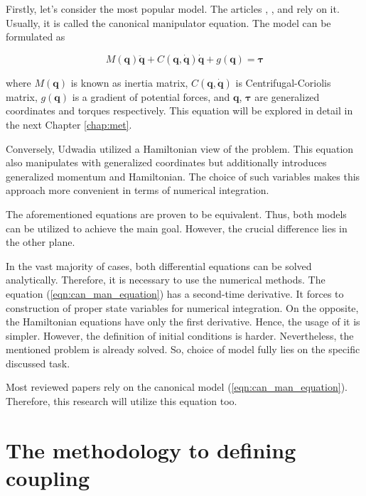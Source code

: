 Firstly, let's consider the most popular model. The articles
\cite{UdwadiaKalabaApproach}, \cite{AppOfUdwadiaKalabaApproach}, and
\cite{UnifiedFrameworkOfRobotControl} rely on it. Usually, it is
called the canonical manipulator equation. The model can be formulated
as


\begin{equation} \label{eqn:can_man_equation}
   M(\mathbf{q})\ddot{\mathbf{q}} +
   C(\mathbf{q}, \dot{\mathbf{q}}) \dot{\mathbf{q}} +
   g(\mathbf{q}) =
   \boldsymbol{\tau}
\end{equation}


where $M(\mathbf{q})$ is known as inertia matrix, $C(\mathbf{q}, \dot{\mathbf{q}})$
is Centrifugal-Coriolis matrix, $g(\mathbf{q})$ is a gradient
of potential forces, and $\mathbf{q}$, $\boldsymbol{\tau}$ are generalized
coordinates and torques respectively. This equation will be explored in detail
in the next Chapter \ref{chap:met}.


Conversely, Udwadia \cite{ConstHamiltonSys} utilized a Hamiltonian view of the
problem. This equation also manipulates with generalized coordinates but
additionally introduces generalized momentum and Hamiltonian. The choice of
such variables makes this approach more convenient in terms of numerical
integration.


The aforementioned equations are proven to be equivalent. Thus, both models
can be utilized to achieve the main goal. However, the crucial difference
lies in the other plane.


In the vast majority of cases, both differential equations can be solved
analytically. Therefore, it is necessary to use the numerical methods. The
equation (\ref{eqn:can_man_equation}) has a second-time derivative. It forces
to construction of proper state variables for numerical integration. On the opposite,
the Hamiltonian equations have only the first derivative. Hence, the usage of it is
simpler. However, the definition of initial conditions is harder.
Nevertheless, the mentioned problem is already solved. So, choice of model
fully lies on the specific discussed task.


Most reviewed papers rely on the canonical model
(\ref{eqn:can_man_equation}). Therefore, this research will utilize this equation
too.


\section{The methodology to defining coupling} \label{sec:interaction_def}


